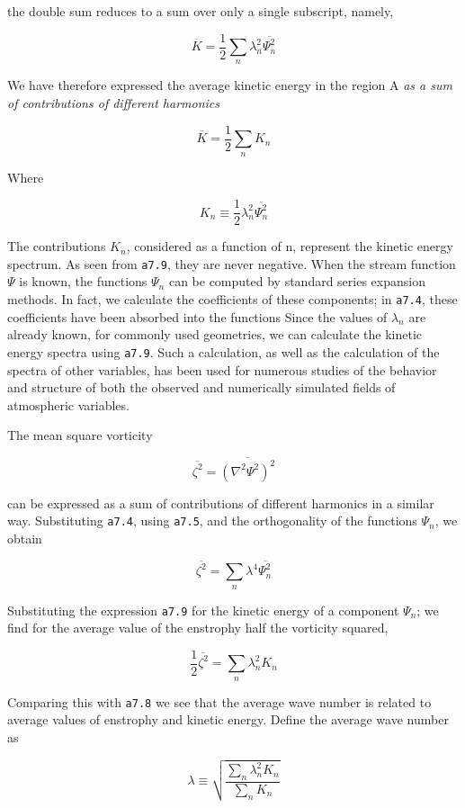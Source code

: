 the double sum reduces to a sum over only a single subscript, namely,

\[\overline{K} = \frac{1}{2}\sum_{n}\lambda_{n}^{2}\overline{\Psi_n^2}\]

We have therefore expressed the average kinetic energy in the region A
\emph{as a sum of contributions of different harmonics}

\[\overline{K} = \frac{1}{2}\sum_{n}K_n\]

Where

\[K_{n} \equiv \frac{1}{2}\lambda_{n}^{2}\overline{\Psi_n^2}\]

The contributions \(K_{n}\), considered as a function of n, represent
the kinetic energy spectrum. As seen from \texttt{a7.9}, they are never
negative. When the stream function \(\Psi\) is known, the functions
\(\Psi_{n}\) can be computed by standard series expansion methods. In
fact, we calculate the coefficients of these components; in
\texttt{a7.4}, these coefficients have been absorbed into the functions
Since the values of \(\lambda_{n}\) are already known, for commonly used
geometries, we can calculate the kinetic energy spectra using
\texttt{a7.9}. Such a calculation, as well as the calculation of the
spectra of other variables, has been used for numerous studies of the
behavior and structure of both the observed and numerically simulated
fields of atmospheric variables.

The mean square vorticity

\[\overline{\zeta^2} = \overline{(\nabla^{2}\Psi^{2} )^2}\]

can be expressed as a sum of contributions of different harmonics in a
similar way. Substituting \texttt{a7.4}, using \texttt{a7.5}, and the
orthogonality of the functions \(\Psi_{n}\), we obtain

\[\overline{\zeta^2} = \sum_{n}\lambda^{4}\overline{\Psi_n^2}\]

Substituting the expression \texttt{a7.9} for the kinetic energy of a
component \(\Psi_{n}\); we find for the average value of the enstrophy
half the vorticity squared,

\[\frac{1}{2}\overline{\zeta^{2}} = \sum_{n}\lambda_n^2 K_{n}\]

Comparing this with \texttt{a7.8} we see that the average wave number is
related to average values of enstrophy and kinetic energy. Define the
average wave number as

\[\lambda \equiv \sqrt{ \frac{\sum_n\lambda_n^2 K_n} {\sum_n K_n} }\]

